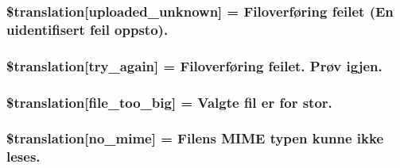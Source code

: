 \subsubsection[{\$translation}]{\setlength{\rightskip}{0pt plus 5cm}\$translation\mbox{[}\textquotesingle{}uploaded\+\_\+unknown\textquotesingle{}\mbox{]} = \textquotesingle{}Filoverføring feilet (En uidentifisert feil oppsto).\textquotesingle{}}\label{class_8upload_8no___n_o_8php_a4a9168e922b827e6a28b5db1c00774ca}
\hypertarget{class_8upload_8no___n_o_8php_a3afc377bd803683314f413a814243066}{}
\subsubsection[{\$translation}]{\setlength{\rightskip}{0pt plus 5cm}\$translation\mbox{[}\textquotesingle{}try\+\_\+again\textquotesingle{}\mbox{]} = \textquotesingle{}Filoverføring feilet. Prøv igjen.\textquotesingle{}}\label{class_8upload_8no___n_o_8php_a3afc377bd803683314f413a814243066}
\hypertarget{class_8upload_8no___n_o_8php_a476278eb4a0c3df56af068e2d511a741}{}
\subsubsection[{\$translation}]{\setlength{\rightskip}{0pt plus 5cm}\$translation\mbox{[}\textquotesingle{}file\+\_\+too\+\_\+big\textquotesingle{}\mbox{]} = \textquotesingle{}Valgte fil er for stor.\textquotesingle{}}\label{class_8upload_8no___n_o_8php_a476278eb4a0c3df56af068e2d511a741}
\hypertarget{class_8upload_8no___n_o_8php_a191a55df8e3bb7f3c51b70f3c1932e02}{}
\subsubsection[{\$translation}]{\setlength{\rightskip}{0pt plus 5cm}\$translation\mbox{[}\textquotesingle{}no\+\_\+mime\textquotesingle{}\mbox{]} = \textquotesingle{}Filens M\+I\+M\+E typen kunne ikke leses.\textquotesingle{}}\label{class_8upload_8no___n_o_8php_a191a55df8e3bb7f3c51b70f3c1932e02}
\hypertarget{class_8upload_8no___n_o_8php_a4d32343e2699edd6fd435f9c832cb9c7}{}
